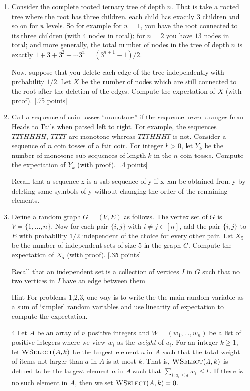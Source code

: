 \documentclass[11pt]{article}
\begin{document}
\begin{enumerate}
\item Consider the complete rooted ternary tree of depth $n$. That is take a rooted tree where the root has three children, each child has exactly 3 children and so on for $n$ levels. So for example for $n=1$, you have the root connected to its three children (with $4$ nodes in total); for $n=2$ you have $13$ nodes in total; and more generally, the total number of nodes in the tree of depth $n$ is exactly $1+3+3^2+\cdots 3^n = (3^{n+1}-1)/2$. 

Now, suppose that you delete each edge of the tree independently with probability $1/2$. Let $X$ be the number of nodes which are still connected to the root after the deletion of the edges. Compute the expectation of $X$ (with proof). [.75 points]

\item Call a sequence of coin tosses ``monotone'' if the sequence never changes from Heads to Tails when parsed left to right. For example, the sequences $TTTHHHH$, $TTTT$ are monotone whereas $TTTHHHT$ is not. Consider a sequence of $n$ coin tosses of a fair coin. For integer $k > 0$, let $Y_k$ be the number of monotone sub-sequences of length $k$ in the $n$ coin tosses. Compute the expectation of $Y_k$ (with proof). [.4 points]

Recall that a sequence x is a sub-sequence of y if x can be obtained from y by deleting some symbols of y without changing the order of the remaining elements. 

\item Define a random graph $G = (V,E)$ as follows. The vertex set of $G$ is $V = \{1,\ldots,n\}$. Now for each pair $\{i,j\}$ with $i \neq j \in [n]$, add the pair $\{i,j\}$ to $E$ with probability $1/2$ independent of the choice for every other pair. Let $X_5$ be the number of independent sets of size $5$ in the graph $G$. Compute the expectation of $X_5$ (with proof). [.35 points]

Recall that an independent set is a collection of vertices $I$ in $G$ such that no two vertices in $I$ have an edge between them.  

\item[Hint] For problems 1,2,3, one way is to write the the main random variable as a sum of `simpler' random variables and use linearity of expectation to compute the expectation.

\item[4] Let $A$ be an array of $n$ positive integers and $W = (w_1,\ldots,w_n)$ be a list of positive integers where we view $w_i$ as the {\em weight} of $a_i$. For an integer $k \geq 1$, let $\textsc{WSelect}(A,k)$ be the largest element $a$ in $A$ such that the total weight of items not larger than $a$ in $A$ is at most $k$. That is, $\textsc{WSelect}(A,k)$ is defined to be the largest element $a$ in $A$ such that $\sum_{i: a_i \leq a} w_i \leq k$. If there is no such element in $A$, then we set $\textsc{WSelect}(A,k) = 0$.


\end{enumerate}
\end{document}
